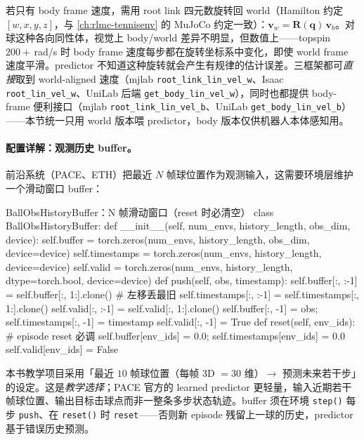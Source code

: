 若只有 body frame 速度，需用 root link 四元数旋转回 world（Hamilton 约定 $[w,x,y,z]$，与 \cref{ch:rlmc-tennisenv} 的 MuJoCo 约定一致）：$\mathbf v_w=\mathbf R(\mathbf q)\,\mathbf v_b$。对球这种各向同性体，视觉上 body/world 差异不明显，但数值上——topspin $200+$\,rad/s 时 body frame 速度每步都在旋转坐标系中变化，即使 world frame 速度平滑。predictor 不知道这种旋转就会产生有规律的估计误差。三框架都可\emph{直接}取到 world-aligned 速度（mjlab \texttt{root\_link\_lin\_vel\_w}、Isaac \texttt{root\_lin\_vel\_w}、UniLab 后端 \texttt{get\_body\_lin\_vel\_w}），同时也都提供 body-frame 便利接口（mjlab \texttt{root\_link\_lin\_vel\_b}、UniLab \texttt{get\_body\_lin\_vel\_b}）——本节统一只用 world 版本喂 predictor，body 版本仅供机器人本体感知用。

\paragraph{配置详解：观测历史 buffer。}前沿系统（PACE\cite{tennis_pace2025}、ETH\cite{tennis_eth2025badminton}）把最近 $N$ 帧球位置作为观测输入，这需要环境层维护一个滑动窗口 buffer：

\begin{codebox}[Python]{BallObsHistoryBuffer：N 帧滑动窗口（reset 时必清空）}
class BallObsHistoryBuffer:
    def __init__(self, num_envs, history_length, obs_dim, device):
        self.buffer = torch.zeros(num_envs, history_length, obs_dim, device=device)
        self.timestamps = torch.zeros(num_envs, history_length, device=device)
        self.valid = torch.zeros(num_envs, history_length, dtype=torch.bool, device=device)
    def push(self, obs, timestamp):
        self.buffer[:, :-1] = self.buffer[:, 1:].clone()        # 左移丢最旧
        self.timestamps[:, :-1] = self.timestamps[:, 1:].clone()
        self.valid[:, :-1] = self.valid[:, 1:].clone()
        self.buffer[:, -1] = obs; self.timestamps[:, -1] = timestamp
        self.valid[:, -1] = True
    def reset(self, env_ids):                                   # episode reset 必调
        self.buffer[env_ids] = 0.0; self.timestamps[env_ids] = 0.0
        self.valid[env_ids] = False
\end{codebox}

\begin{finenote}
本书教学项目采用「最近 $10$ 帧球位置（每帧 3D $=30$ 维）$\to$ 预测未来若干步」的设定。这是\emph{教学选择}；PACE 官方的 learned predictor 更轻量，输入近期若干帧球位置、输出目标击球点而非一整条多步状态轨迹\cite{tennis_pace2025}。buffer 须在环境 \verb|step()| 每步 \verb|push|、在 \verb|reset()| 时 \verb|reset|——否则新 episode 残留上一球的历史，predictor 基于错误历史预测。
\end{finenote}

